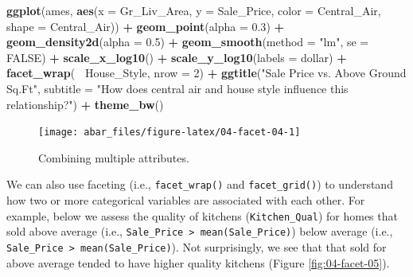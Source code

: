\documentclass[]{book}
\newenvironment{Shaded}{\begin{snugshade}}{\end{snugshade}}
\newcommand{\DataTypeTok}[1]{\textcolor[rgb]{0.13,0.29,0.53}{#1}}
\newcommand{\DecValTok}[1]{\textcolor[rgb]{0.00,0.00,0.81}{#1}}
\newcommand{\FloatTok}[1]{\textcolor[rgb]{0.00,0.00,0.81}{#1}}
\newcommand{\KeywordTok}[1]{\textcolor[rgb]{0.13,0.29,0.53}{\textbf{#1}}}
\newcommand{\NormalTok}[1]{#1}
\newcommand{\OperatorTok}[1]{\textcolor[rgb]{0.81,0.36,0.00}{\textbf{#1}}}
\newcommand{\OtherTok}[1]{\textcolor[rgb]{0.56,0.35,0.01}{#1}}
\newcommand{\StringTok}[1]{\textcolor[rgb]{0.31,0.60,0.02}{#1}}
\theoremstyle{definition}
\theoremstyle{definition}
\theoremstyle{definition}
\theoremstyle{remark}
\begin{document}
\begin{Shaded}
\begin{Highlighting}[]
\KeywordTok{ggplot}\NormalTok{(ames, }\KeywordTok{aes}\NormalTok{(}\DataTypeTok{x =}\NormalTok{ Gr_Liv_Area, }\DataTypeTok{y =}\NormalTok{ Sale_Price, }\DataTypeTok{color =}\NormalTok{ Central_Air, }\DataTypeTok{shape =}\NormalTok{ Central_Air)) }\OperatorTok{+}
\StringTok{  }\KeywordTok{geom_point}\NormalTok{(}\DataTypeTok{alpha =} \FloatTok{0.3}\NormalTok{) }\OperatorTok{+}
\StringTok{  }\KeywordTok{geom_density2d}\NormalTok{(}\DataTypeTok{alpha =} \FloatTok{0.5}\NormalTok{) }\OperatorTok{+}
\StringTok{  }\KeywordTok{geom_smooth}\NormalTok{(}\DataTypeTok{method =} \StringTok{"lm"}\NormalTok{, }\DataTypeTok{se =} \OtherTok{FALSE}\NormalTok{) }\OperatorTok{+}
\StringTok{  }\KeywordTok{scale_x_log10}\NormalTok{() }\OperatorTok{+}
\StringTok{  }\KeywordTok{scale_y_log10}\NormalTok{(}\DataTypeTok{labels =}\NormalTok{ dollar) }\OperatorTok{+}
\StringTok{  }\KeywordTok{facet_wrap}\NormalTok{(}\OperatorTok{~}\StringTok{ }\NormalTok{House_Style, }\DataTypeTok{nrow =} \DecValTok{2}\NormalTok{) }\OperatorTok{+}
\StringTok{  }\KeywordTok{ggtitle}\NormalTok{(}\StringTok{"Sale Price vs. Above Ground Sq.Ft"}\NormalTok{,}
          \DataTypeTok{subtitle =} \StringTok{"How does central air and house style influence this relationship?"}\NormalTok{) }\OperatorTok{+}
\StringTok{  }\KeywordTok{theme_bw}\NormalTok{()}
\end{Highlighting}
\end{Shaded}

\begin{figure}

{\centering \texttt{[image: abar\_files/figure-latex/04-facet-04-1]} 

}

\caption{Combining multiple attributes.}\label{fig:04-facet-04}
\end{figure}

We can also use faceting (i.e., \texttt{facet\_wrap()} and
\texttt{facet\_grid()}) to understand how two or more categorical
variables are associated with each other. For example, below we assess
the quality of kitchens (\texttt{Kitchen\_Qual}) for homes that sold
above average (i.e.,
\texttt{Sale\_Price\ \textgreater{}\ mean(Sale\_Price)}) below average
(i.e., \texttt{Sale\_Price\ \textgreater{}\ mean(Sale\_Price)}). Not
surprisingly, we see that that sold for above average tended to have
higher quality kitchens (Figure \ref{fig:04-facet-05}).
\end{document}
